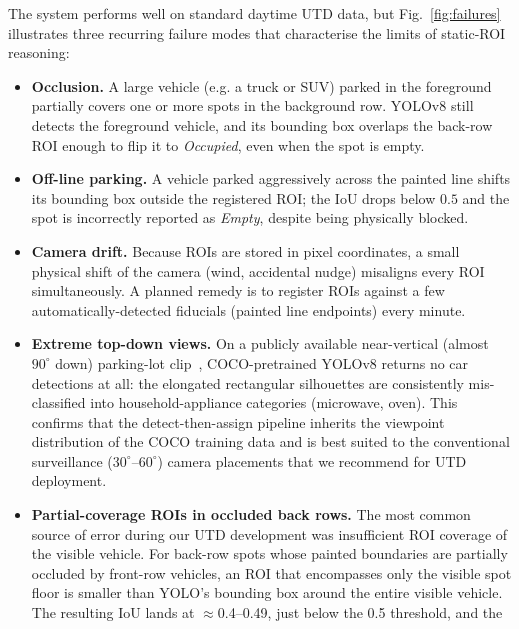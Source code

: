 \documentclass[10pt,twocolumn,letterpaper]{article}
\begin{document}
The system performs well on standard daytime UTD data, but
Fig.~\ref{fig:failures} illustrates three recurring failure modes that
characterise the limits of static-ROI reasoning:
\begin{itemize}
    \itemsep0em
    \item \textbf{Occlusion.} A large vehicle (e.g. a truck or SUV) parked
          in the foreground partially covers one or more spots in the
          background row. YOLOv8 still detects the foreground vehicle, and
          its bounding box overlaps the back-row ROI enough to flip it to
          \emph{Occupied}, even when the spot is empty.
    \item \textbf{Off-line parking.} A vehicle parked aggressively across
          the painted line shifts its bounding box outside the registered
          ROI; the IoU drops below $0.5$ and the spot is incorrectly
          reported as \emph{Empty}, despite being physically blocked.
    \item \textbf{Camera drift.} Because ROIs are stored in pixel
          coordinates, a small physical shift of the camera (wind,
          accidental nudge) misaligns every ROI simultaneously. A planned
          remedy is to register ROIs against a few automatically-detected
          fiducials (painted line endpoints) every minute.
    \item \textbf{Extreme top-down views.} On a publicly available
          near-vertical (almost $90^\circ$ down) parking-lot
          clip~\cite{moaz2024parking}, COCO-pretrained YOLOv8 returns no
          car detections at all: the elongated rectangular silhouettes are
          consistently mis-classified into household-appliance categories
          (microwave, oven). This confirms that the detect-then-assign
          pipeline inherits the viewpoint distribution of the COCO training
          data and is best suited to the conventional surveillance
          ($30^\circ\text{--}60^\circ$) camera placements that we recommend
          for UTD deployment.
    \item \textbf{Partial-coverage ROIs in occluded back rows.} The
          most common source of error during our UTD development was
          insufficient ROI coverage of the visible vehicle. For back-row
          spots whose painted boundaries are partially occluded by
          front-row vehicles, an ROI that encompasses only the visible
          spot floor is smaller than YOLO's bounding box around the
          entire visible vehicle. The resulting IoU lands at
          $\approx$0.4--0.49, just below the 0.5 threshold, and the

\end{itemize}
\end{document}
